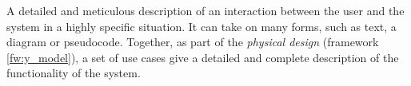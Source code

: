 \begin{tool} \label{tool:use_case} 
  A detailed and meticulous description of an interaction between the user and the system in a highly specific situation. It can take on many forms, such as text, a diagram or pseudocode. Together, as part of the \emph{physical design} (framework \ref{fw:y_model}), a set of use cases give a detailed and complete description of the functionality of the system. \cite[p. 65]{benyon_14}
\end{tool}

